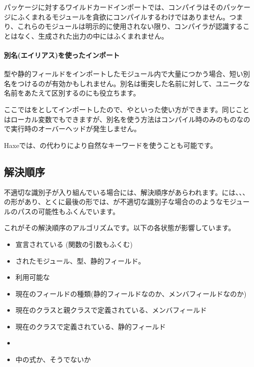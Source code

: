 パッケージに対するワイルドカードインポートでは、コンパイラはそのパッケージにふくまれるモジュールを貪欲にコンパイルするわけではありません。つまり、これらのモジュールは明示的に使用されない限り、コンパイラが認識することはなく、生成された出力の中にはふくまれません。

\paragraph{別名(エイリアス)を使ったインポート}

型や静的フィールドをインポートしたモジュール内で大量につかう場合、短い別名をつけるのが有効かもしれません。別名は衝突した名前に対して、ユニークな名前をあたえて区別するのにも役立ちます。


ここではをとしてインポートしたので、やといった使い方ができます。同じことはローカル変数でもできますが、別名を使う方法はコンパイル時のみのものなので実行時のオーバーヘッドが発生しません。


Haxeでは、の代わりにより自然なキーワードを使うことも可能です。

\subsection{解決順序}
\label{type-system-resolution-order}

不適切な識別子が入り組んでいる場合には、解決順序があらわれます。には、、、の形があり、とくに最後の形では、が不適切な識別子な場合ののようなモジュールのパスの可能性もふくんでいます。

これがその解決順序のアルゴリズムです。以下の各状態が影響しています。

\begin{itemize}
	\item 宣言されている (関数の引数もふくむ)
	\item {} されたモジュール、型、静的フィールド。
	\item 利用可能な
	\item 現在のフィールドの種類(静的フィールドなのか、メンバフィールドなのか) 
	\item 現在のクラスと親クラスで定義されている、メンバフィールド
	\item 現在のクラスで定義されている、静的フィールド
	\item {}
	\item {}中の式か、そうでないか
\end{itemize}

